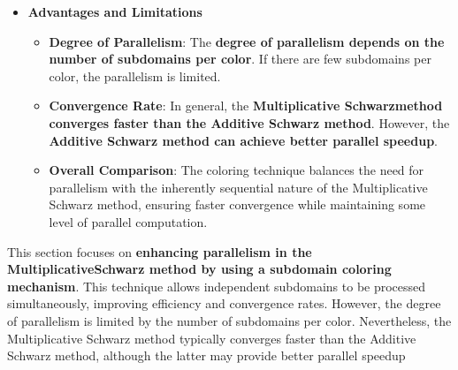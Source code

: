 \begin{itemize}
    \item[\textcolor{Green3}{\faIcon{check-circle}}] \textcolor{Green3}{\textbf{Advantages and Limitations}}
    \begin{itemize}
        \item[\textcolor{Green3}{\faIcon{check}}] \textcolor{Green3}{\textbf{Degree of Parallelism}}: The \textbf{degree of parallelism depends on the number of subdomains per color}. If there are few subdomains per color, the parallelism is limited.
        \item[\textcolor{Green3}{\faIcon{check}}] \textcolor{Green3}{\textbf{Convergence Rate}}: In general, the \textbf{Multiplicative Schwarz\break method converges faster than the Additive Schwarz method}. However, the \textbf{Additive Schwarz method can achieve better parallel speedup}.
        \item[\textcolor{Green3}{\faIcon{check}}] \textcolor{Green3}{\textbf{Overall Comparison}}: The coloring technique balances the need for parallelism with the inherently sequential nature of the Multiplicative Schwarz method, ensuring faster convergence while maintaining some level of parallel computation.
    \end{itemize}
\end{itemize}
This section focuses on \textbf{enhancing parallelism in the Multiplicative\break Schwarz method by using a subdomain coloring mechanism}. This technique allows independent subdomains to be processed simultaneously, improving efficiency and convergence rates. However, the degree of parallelism is limited by the number of subdomains per color. Nevertheless, the Multiplicative Schwarz method typically converges faster than the Additive Schwarz method, although the latter may provide better parallel speedup